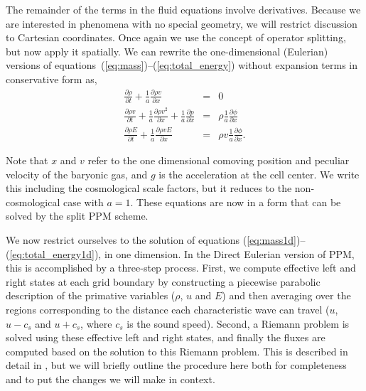 The remainder of the terms in the fluid equations
involve derivatives.  
Because we are interested in phenomena with no special geometry, we will
restrict discussion to Cartesian coordinates.
Once again we use the concept of operator splitting,
but now apply it spatially.   We can rewrite the one-dimensional (Eulerian) 
versions of equations~(\ref{eq:mass})--(\ref{eq:total_energy}) without expansion terms
in conservative form as,
\begin{eqnarray}
\frac{\partial \rho}{\partial t}  + \frac{1}{a} \frac{\partial \rho v }{\partial x}    & = &  
     0 \label{eq:mass1d} \\
\frac{\partial \rho v}{\partial t}  + \frac{1}{a} \frac{\partial \rho v^2}{\partial x}   + 
      \frac{1}{a} \frac{\partial p}{ \partial x} & = & 
      \rho \frac{1}{a} \frac{\partial \phi}{ \partial x}  \label{eq:momentum1d}  \\
\frac{\partial \rho E}{\partial t}  + \frac{1}{a} \frac{\partial \rho v E}{\partial x}  & =  &
      \rho v \frac{1}{a} \frac{\partial \phi}{\partial x}. \label{eq:total_energy1d}
\end{eqnarray}

%
Note that $x$ and $v$ refer to the one dimensional comoving position and 
peculiar velocity of the baryonic gas, and $g$ is the acceleration at the cell center.
We write this including the cosmological scale factors, but it reduces to the non-cosmological case with $a = 1$.
These equations are now in a form that can be solved by the split PPM scheme.



We now restrict ourselves to the solution of equations
(\ref{eq:mass1d})--(\ref{eq:total_energy1d}), in one
dimension.  In the Direct Eulerian version of PPM, this is
accomplished by a three-step process.  First, we compute effective
left and right states at each grid boundary by constructing a
piecewise parabolic description of the primative variables ($\rho$, $u$
and $E$) and then averaging over the regions corresponding to the
distance each characteristic wave can travel ($u$, $u-c_s$ and
$u+c_s$, where $c_s$ is the sound speed).
Second, a Riemann problem is solved using these effective left and
right states, and finally the fluxes are computed based on the
solution to this Riemann problem.  This is described in detail in
\citet{1984JCoPh..54..174C}, but we will briefly outline the procedure
here both for completeness and to put the changes we will make in
context.


